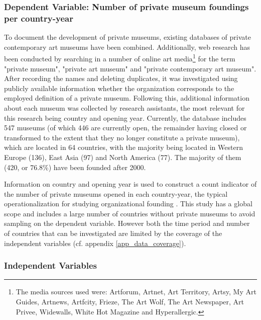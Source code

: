 \documentclass[11pt]{article}
\begin{document}
\subsubsection*{Dependent Variable: Number of private museum foundings per country-year}


To document the development of private museums, existing databases of private contemporary art museums \parencite{LarrysList_2015_report,Independent_collectors,global_private_museum_network_2020_museums,BMW_Independent_Collectors_2018_artguide,vdEerenbeemt_vdWauw_DDD_2016} have been combined.
Additionally, web research has been conducted by searching in a number of online art media\footnote{The media sources used were: Artforum, Artnet, Art Territory, Artsy, My Art Guides, Artnews, Artfcity, Frieze, The Art Wolf, The Art Newspaper, Art Privee, Widewalls, White Hot Magazine and Hyperallergic.} for the term "private museum", "private art museum" and "private contemporary art museum".
After recording the names and deleting duplicates, it was investigated using publicly available information whether the organization corresponds to the employed definition of a private museum.
Following this, additional information about each museum was collected by research assistants, the most relevant for this research being country and opening year.
Currently, the database includes 547 museums (of which 446 are currently open, the remainder having closed or transformed to the extent that they no longer constitute a private museum), which are located in 64 countries, with the majority being located in Western Europe (136), East Asia (97) and North America (77).
The majority of them (420, or 76.8\%) have been founded after 2000.


Information on country and opening year is used to construct a count indicator of the number of private museums opened in each country-year, the typical operationalization for studying organizational founding \parencite{Bogaert_etal_2014_ecological}. 
This study has a global scope and includes a large number of countries without private museums to avoid sampling on the dependent variable. 
However both the time period and number of countries that can be investigated are limited by the coverage of the independent variables (cf. appendix \ref{app_data_coverage}). 


\subsubsection*{Independent Variables}
\end{document}
